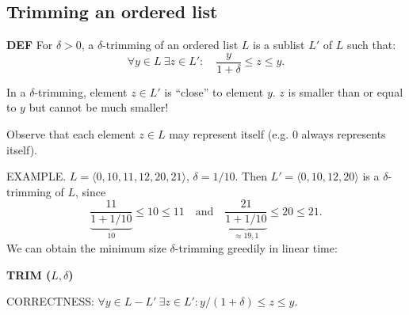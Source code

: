 \subsection{Trimming an ordered list}
\begin{notesdefinition}
\textbf{DEF} For $\delta>0$, a $\delta$-trimming of an ordered list $L$ is a sublist $L'$ of $L$ such that:
\[\forall y\in L\ \exists z\in L':\quad\frac y{1+\delta}\leq z\leq y.\]
\end{notesdefinition}
In a $\delta$-trimming, element $z\in L'$ is ``close'' to element $y$. $z$ is smaller than or equal to $y$ but cannot be much smaller!

Observe that each element $z\in L$ may represent itself (e.g. 0 always represents itself).

EXAMPLE. $L=\langle0,10,11,12,20,21\rangle$, $\delta=1/10$.
Then $L'=\langle0,10,12,20\rangle$ is a $\delta$-trimming of $L$, since
\[\underbrace{\frac{11}{1+1/10}}_{10}\leq10\leq11
\quad\text{and}\quad
\underbrace{\frac{21}{1+1/10}}_{\approx19,1}\leq20\leq21.\]
We can obtain the minimum size $\delta$-trimming greedily in linear time:
\begin{notesalgorithm}
\textbf{TRIM ($L,\delta$)}
\begin{notespseudocode}
\end{notespseudocode}
\end{notesalgorithm}
CORRECTNESS: $\forall y\in L-L'\ \exists z\in L':y/(1+\delta)\leq z\leq y$.

